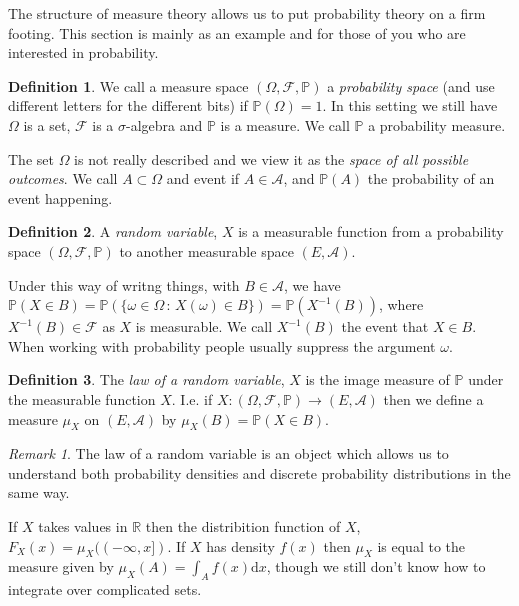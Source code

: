 \documentclass[
]{book}
\theoremstyle{definition}
\newtheorem{definition}{Definition}[chapter]
\theoremstyle{definition}
\theoremstyle{definition}
\theoremstyle{definition}
\theoremstyle{remark}
\newtheorem*{remark}{Remark}
\begin{document}
The structure of measure theory allows us to put probability theory on a firm footing. This section is mainly as an example and for those of you who are interested in probability.

\begin{definition}
We call a measure space \((\Omega, \mathcal{F}, \mathbb{P})\) a \emph{probability space} (and use different letters for the different bits) if \(\mathbb{P}(\Omega) = 1\). In this setting we still have \(\Omega\) is a set, \(\mathcal{F}\) is a \(\sigma\)-algebra and \(\mathbb{P}\) is a measure. We call \(\mathbb{P}\) a probability measure.
\end{definition}

The set \(\Omega\) is not really described and we view it as the \emph{space of all possible outcomes}. We call \(A \subset \Omega\) and event if \(A \in \mathcal{A}\), and \(\mathbb{P}(A)\) the probability of an event happening.

\begin{definition}
A \emph{random variable}, \(X\) is a measurable function from a probability space \((\Omega, \mathcal{F}, \mathbb{P})\) to another measurable space \((E, \mathcal{A})\).
\end{definition}

Under this way of writng things, with \(B \in \mathcal{A}\), we have \(\mathbb{P}(X \in B) = \mathbb{P}(\{ \omega \in \Omega \,:\, X(\omega) \in B\}) = \mathbb{P}( X^{-1}(B))\), where \(X^{-1}(B) \in \mathcal{F}\) as \(X\) is measurable. We call \(X^{-1}(B)\) the event that \(X \in B\). When working with probability people usually suppress the argument \(\omega\).

\begin{definition}
The \emph{law of a random variable}, \(X\) is the image measure of \(\mathbb{P}\) under the measurable function \(X\). I.e. if \(X: (\Omega, \mathcal{F}, \mathbb{P}) \rightarrow (E, \mathcal{A})\) then we define a measure \(\mu_X\) on \((E, \mathcal{A})\) by \(\mu_X(B) = \mathbb{P}(X \in B)\).
\end{definition}

\begin{remark}
The law of a random variable is an object which allows us to understand both probability densities and discrete probability distributions in the same way.

If \(X\) takes values in \(\mathbb{R}\) then the distribition function of \(X\), \(F_X(x) = \mu_X((-\infty, x])\). If \(X\) has density \(f(x)\) then \(\mu_X\) is equal to the measure given by \(\mu_X(A) = \int_A f(x) \mathrm{d}x\), though we still don't know how to integrate over complicated sets.
\end{remark}
\end{document}
